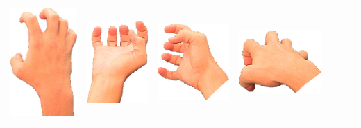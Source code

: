 \documentclass{article}
\begin{document}
\begin{center}
\begin{tabular}{r*{6}{c}}
\includegraphics[scale=0.1]{images/05-05-3.jpg}&
\includegraphics[scale=0.1]{images/05-05-4.jpg}&
\includegraphics[scale=0.1]{images/05-05-5.jpg}&
\includegraphics[scale=0.1]{images/05-05-6.jpg}\\

\end{tabular}
\end{center}
\end{document}
